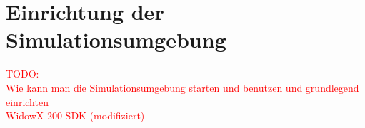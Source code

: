 



\section{Einrichtung der Simulationsumgebung}\label{appendix1:Einrichtung_der_Simulationsumgebung}
\textcolor{red}{TODO:\\
Wie kann man die Simulationsumgebung starten und benutzen und grundlegend einrichten\\
WidowX 200 SDK (modifiziert)
}
